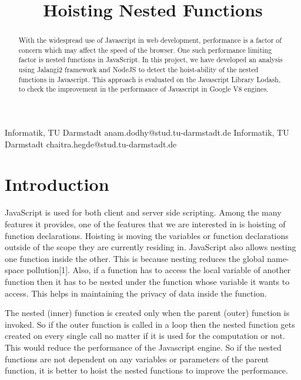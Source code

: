 \documentclass[authoryear,preprint]{sigplanconf}
\begin{document}
\setlength{\pdfpageheight}{\paperheight}
\setlength{\pdfpagewidth}{\paperwidth}


\title{Hoisting Nested Functions}

           {Informatik, TU Darmstadt}
           {anam.dodhy@stud.tu-darmstadt.de}
           {Informatik, TU Darmstadt}
           {chaitra.hegde@stud.tu-darmstadt.de}

\maketitle

\begin{abstract}
With the widespread use of Javascript in web development, performance is a factor of concern which may affect the speed of the browser. One such performance limiting factor is nested functions in JavaScript. In this project, we have developed an analysis using Jalangi2 framework and NodeJS to detect the hoist-ability of the nested functions in Javascript. This approach is evaluated on the Javascript Library Lodash, to check the improvement in the performance of Javascript in Google V8 engines.

\end{abstract}



\section{Introduction}
\label{sec:introduction}
JavaScript is used for both client and server side scripting. Among the many features it provides, one of the features that we are interested in is hoisting of function declarations. Hoisting is moving the variables or function declarations outside of the scope they are currently residing in. JavaScript also allows nesting one function inside the other. This is because nesting reduces the global name-space pollution[1]. Also, if a function has to access the local variable of another function then it has to be nested under the function whose variable it wants to access. This helps in maintaining the privacy of data inside the function. \par

The nested (inner) function is created only when the parent (outer) function is invoked. So if the outer function is called in a loop then the nested function gets created on every single call no matter if it is used for the computation or not. This would reduce the performance of the Javascript engine. So if the nested functions are not dependent on any variables or parameters of the parent function, it is better to hoist the nested functions to improve the performance. \par
\end{document}
